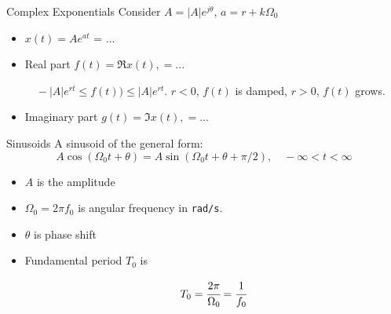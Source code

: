 \documentclass[aspectratio=169,xcolor=dvipsnames,svgnames,x11names,fleqn]{beamer}
\begin{document}
\begin{frame}{Complex Exponentials}
Consider $A = |A|e^{j\theta}$, $a = r + k\Omega_0$
\begin{itemize}
    \item $x(t) = Ae^{at}$ = ...
    \item Real part $f(t) = \Re{x(t)}, = ... $
    
    \vspace{20pt}
    
    $\quad  -|A|e^{rt} \leq f(t)) \leq |A|e^{rt}$. $r< 0$, $f(t)$ is damped, $r>0 $, $f(t)$ grows.
    \item  Imaginary part $g(t) = \Im{x(t)}, = ... $
    
    \vspace{20pt}
\end{itemize}
    
\end{frame}

\begin{frame}{Sinusoids}
A sinusoid of the general form:
$$
A\cos(\Omega_0 t + \theta) = A\sin (\Omega_0 t + \theta + \pi/ 2), \quad -\infty < t < \infty
$$

\begin{itemize}
    \item $A$ is the amplitude
    \item $\Omega_0 = 2\pi f_0$ is angular frequency in \texttt{rad/s}.
    \item $\theta$ is phase shift
    \item Fundamental period $T_0$ is 

    $$
    T_0 = \cfrac{2\pi}{\Omega_0} = \cfrac{1}{f_0}
    $$
\end{itemize}
    
\end{frame}
\end{document}
